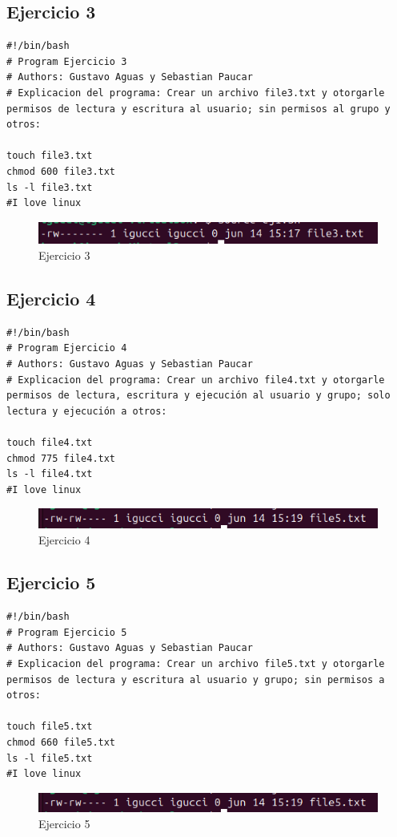 \documentclass[11pt,twoside]{book}
\begin{document}
\subsection{Ejercicio 3}
\begin{lstlisting}
#!/bin/bash
# Program Ejercicio 3
# Authors: Gustavo Aguas y Sebastian Paucar
# Explicacion del programa: Crear un archivo file3.txt y otorgarle permisos de lectura y escritura al usuario; sin permisos al grupo y otros:

touch file3.txt
chmod 600 file3.txt
ls -l file3.txt
#I love linux
\end{lstlisting}
\begin{figure}
    \centering
    \includegraphics[width=1\linewidth]{pnum/ej3.png}
    \caption{Ejercicio 3}
\end{figure}
\newpage
\subsection{Ejercicio 4}
\begin{lstlisting}
#!/bin/bash
# Program Ejercicio 4
# Authors: Gustavo Aguas y Sebastian Paucar
# Explicacion del programa: Crear un archivo file4.txt y otorgarle permisos de lectura, escritura y ejecución al usuario y grupo; solo lectura y ejecución a otros:

touch file4.txt
chmod 775 file4.txt
ls -l file4.txt
#I love linux
\end{lstlisting}
\begin{figure}
    \centering
    \includegraphics[width=1\linewidth]{pnum/ej5.png}
    \caption{Ejercicio 4}
\end{figure}
\newpage
\subsection{Ejercicio 5}
\begin{lstlisting}
#!/bin/bash
# Program Ejercicio 5
# Authors: Gustavo Aguas y Sebastian Paucar
# Explicacion del programa: Crear un archivo file5.txt y otorgarle permisos de lectura y escritura al usuario y grupo; sin permisos a otros:

touch file5.txt
chmod 660 file5.txt
ls -l file5.txt
#I love linux
\end{lstlisting}
\begin{figure}
    \centering
    \includegraphics[width=1\linewidth]{pnum/ej5.png}
    \caption{Ejercicio 5}
\end{figure}
\newpage
\end{document}
